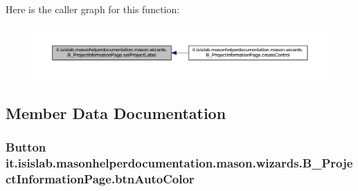 Here is the caller graph for this function\-:\nopagebreak
\begin{figure}[H]
\begin{center}
\leavevmode
\includegraphics[width=350pt]{classit_1_1isislab_1_1masonhelperdocumentation_1_1mason_1_1wizards_1_1_b___project_information_page_afa7497cd5a5b4b3c5fb7f7f1397ebb72_icgraph}
\end{center}
\end{figure}




\subsection{Member Data Documentation}
\hypertarget{classit_1_1isislab_1_1masonhelperdocumentation_1_1mason_1_1wizards_1_1_b___project_information_page_a60a4bbca5d0ee37acbc02b31f69db1bd}{
\subsubsection[{btn\-Auto\-Color}]{\setlength{\rightskip}{0pt plus 5cm}Button it.\-isislab.\-masonhelperdocumentation.\-mason.\-wizards.\-B\-\_\-\-Project\-Information\-Page.\-btn\-Auto\-Color\hspace{0.3cm}{\ttfamily [private]}}}\label{classit_1_1isislab_1_1masonhelperdocumentation_1_1mason_1_1wizards_1_1_b___project_information_page_a60a4bbca5d0ee37acbc02b31f69db1bd}
